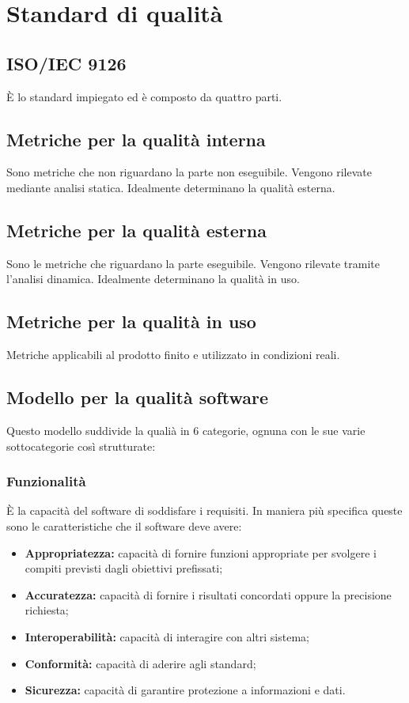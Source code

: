 \section{Standard di qualit\`a}
\subsection{ISO/IEC 9126}
\`E lo standard impiegato ed \`e composto da quattro parti.
\subsection{Metriche per la qualit\`a interna}
Sono metriche che non riguardano la parte non eseguibile. Vengono rilevate mediante analisi statica. Idealmente determinano la qualit\`a esterna.
\subsection{Metriche per la qualit\`a esterna}
Sono le metriche che riguardano la parte eseguibile. Vengono rilevate tramite l'analisi dinamica. Idealmente determinano la qualit\`a in uso.
\subsection{Metriche per la qualit\`a in uso}
Metriche applicabili al prodotto finito e utilizzato in condizioni reali.
\subsection{Modello per la qualit\`a software}
Questo modello suddivide la quali\`a in 6 categorie, ognuna con le sue varie sottocategorie cos\`i strutturate:
\subsubsection{Funzionalit\`a}
\`E la capacit\`a del software di soddisfare i requisiti. In maniera pi\`u specifica queste sono le caratteristiche che il software deve avere:
\begin{itemize}
    \item \textbf{Appropriatezza:} capacit\`a di fornire funzioni appropriate per svolgere i compiti previsti dagli obiettivi prefissati;
    \item \textbf{Accuratezza:} capacit\`a di fornire i risultati concordati oppure la precisione richiesta;
    \item \textbf{Interoperabilit\`a:} capacit\`a  di interagire con altri sistema;
    \item \textbf{Conformit\`a:} capacit\`a di aderire agli standard;
    \item \textbf{Sicurezza:} capacit\`a di garantire protezione a informazioni e dati.
\end{itemize}
